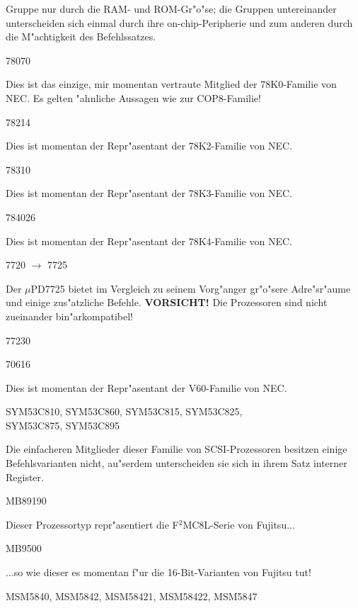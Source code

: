 \documentclass[12pt,a4paper,twoside]{report}
\begin{document}
Gruppe nur durch die RAM- und ROM-Gr"o"se; die Gruppen untereinander
unterscheiden sich einmal durch ihre on-chip-Peripherie und
zum anderen durch die M"achtigkeit des Befehlssatzes.
\begin{cpulist}
   78070
\end{cpulist}
Dies ist das einzige, mir momentan vertraute Mitglied der
78K0-Familie von NEC.  Es gelten "ahnliche Aussagen wie zur
COP8-Familie!
\begin{cpulist}
   78214
\end{cpulist}
Dies ist momentan der Repr"asentant der 78K2-Familie von NEC.
\begin{cpulist}
   78310
\end{cpulist}
Dies ist momentan der Repr"asentant der 78K3-Familie von NEC.
\begin{cpulist}
   784026
\end{cpulist}
Dies ist momentan der Repr"asentant der 78K4-Familie von NEC.
\begin{cpulist}
   7720 $\rightarrow$ 7725
\end{cpulist}
Der $\mu$PD7725 bietet im Vergleich zu seinem Vorg"anger gr"o"sere
Adre"sr"aume und einige zus"atzliche Befehle. {\bf VORSICHT!}  Die
Prozessoren sind nicht zueinander bin"arkompatibel!
\begin{cpulist}
   77230
\end{cpulist}
\begin{cpulist}
   70616
\end{cpulist}
Dies ist momentan der Repr"asentant der V60-Familie von NEC.
\begin{cpulist}
   SYM53C810, SYM53C860, SYM53C815, SYM53C825, \\
\> SYM53C875, SYM53C895
\end{cpulist}
Die einfacheren Mitglieder dieser Familie von SCSI-Prozessoren besitzen
einige Befehlsvarianten nicht, au"serdem unterscheiden sie sich in ihrem
Satz interner Register.
\begin{cpulist}
   MB89190
\end{cpulist}
Dieser Prozessortyp repr"asentiert die F$^{2}$MC8L-Serie von Fujitsu...
\begin{cpulist}
   MB9500
\end{cpulist}
...so wie dieser es momentan f"ur die 16-Bit-Varianten von Fujitsu tut!
\begin{cpulist}
   MSM5840, MSM5842, MSM58421, MSM58422, MSM5847
\end{cpulist}
\end{document}
